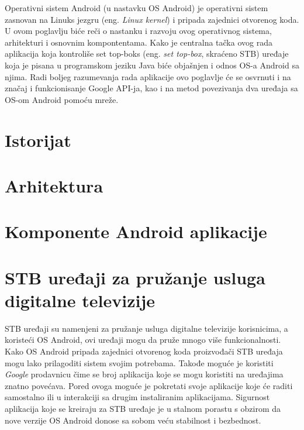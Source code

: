 \documentclass[../TamaraIvanovicMasterRad.tex]{subfiles}
\begin{document}
Operativni sistem Android (u nastavku OS Android) je operativni sistem zasnovan na Linuks jezgru (eng. \textit{Linux kernel}) i pripada zajednici otvorenog koda. U ovom poglavlju biće reči o nastanku i razvoju ovog operativnog sistema, arhitekturi i osnovnim kompontentama. Kako je centralna tačka ovog rada aplikacija koja kontroliše set top-boks (eng. \textit{set top-box}, skraćeno STB) uređaje koja je pisana u programskom jeziku Java biće objašnjen i odnos OS-a Android sa njima. Radi boljeg razumevanja rada aplikacije ovo poglavlje će se osvrnuti i na značaj i funkcionisanje Google API-ja, kao i na metod povezivanja dva uređaja sa OS-om Android pomoću mreže. 
\section{Istorijat}



\section{Arhitektura}



\section{Komponente Android aplikacije}


\section{STB uređaji za pružanje usluga digitalne televizije}
STB uređaji su namenjeni za pružanje usluga digitalne televizije korisnicima, a koristeći OS Android, ovi uređaji mogu da pruže mnogo više funkcionalnosti. Kako OS Android pripada zajednici otvorenog koda proizvođači STB uređaja mogu lako prilagoditi sistem svojim potrebama. Takođe moguće je koristiti \textit{Google} prodavnicu čime se broj aplikacija koje se mogu koristiti na uređajima znatno povećava. Pored ovoga moguće je pokretati svoje aplikacije koje će raditi samostalno ili u interakciji sa drugim instaliranim aplikacijama. Sigurnost aplikacija koje se kreiraju za STB uređaje je u stalnom porastu s obzirom da nove verzije OS Android donose sa sobom veću stabilnost i bezbednost. 
\end{document}
